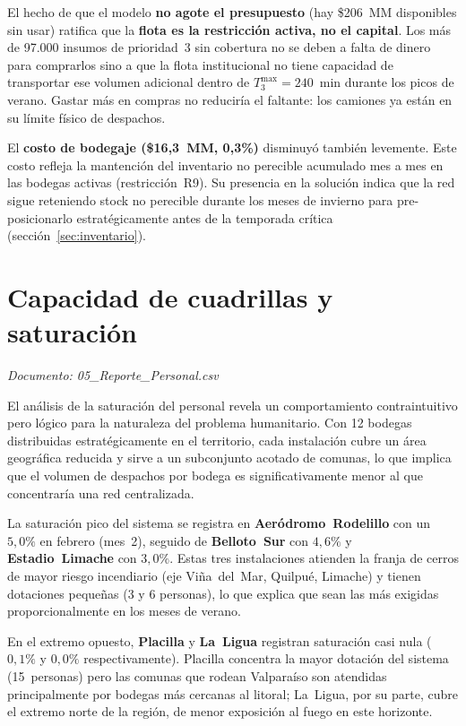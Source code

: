 \documentclass[letterpaper]{article}
\begin{document}
El hecho de que el modelo \textbf{no agote el presupuesto} (hay \$206~MM
disponibles sin usar) ratifica que la \textbf{flota es la restricción activa, no el capital}.
Los más de 97.000 insumos de prioridad~3 sin cobertura no se deben a falta de dinero para comprarlos sino a que la flota institucional no tiene
capacidad de transportar ese volumen adicional dentro de $T^{\max}_3 = 240$~min
durante los picos de verano. Gastar más en compras no reduciría el faltante:
los camiones ya están en su límite físico de despachos.

El \textbf{costo de bodegaje (\$16{,}3~MM, 0{,}3\%)} disminuyó también levemente.
Este costo refleja la mantención del inventario no perecible acumulado mes a mes en las bodegas activas (restricción~R9). Su presencia en la solución indica que la red sigue reteniendo stock no perecible durante los meses de invierno para pre-posicionarlo estratégicamente antes de la temporada crítica (sección~\ref{sec:inventario}).

\section{Capacidad de cuadrillas y saturación}

\textit{Documento: 05\_Reporte\_Personal.csv}

El análisis de la saturación del personal revela un comportamiento
contraintuitivo pero lógico para la naturaleza del problema humanitario. Con 12
bodegas distribuidas estratégicamente en el territorio, cada instalación cubre
un área geográfica reducida y sirve a un subconjunto acotado de comunas, lo que
implica que el volumen de despachos por bodega es significativamente menor al
que concentraría una red centralizada.

La saturación pico del sistema se registra en \textbf{Aeródromo~Rodelillo}
con un $5{,}0\%$ en febrero (mes~2), seguido de \textbf{Belloto~Sur} con
$4{,}6\%$ y \textbf{Estadio~Limache} con $3{,}0\%$. Estas tres instalaciones
atienden la franja de cerros de mayor riesgo incendiario (eje Viña~del~Mar,
Quilpué, Limache) y tienen dotaciones pequeñas (3 y 6 personas), lo que
explica que sean las más exigidas proporcionalmente en los meses de verano.

En el extremo opuesto, \textbf{Placilla} y \textbf{La~Ligua} registran
saturación casi nula ($0{,}1\%$ y $0{,}0\%$ respectivamente). Placilla concentra la mayor dotación del sistema
(15~personas) pero las comunas que rodean Valparaíso son atendidas
principalmente por bodegas más cercanas al litoral; La~Ligua, por su parte, cubre el extremo
norte de la región, de menor exposición al fuego en este horizonte.
\end{document}
